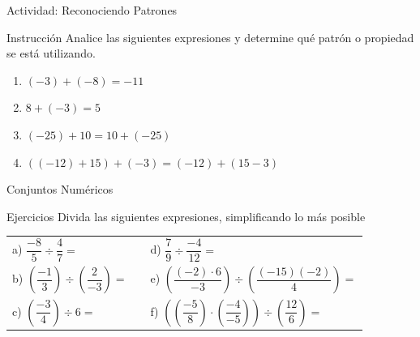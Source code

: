 \documentclass[aspectratio=169,handout,11pt]{beamer}
\begin{document}
	\begin{frame}{Actividad: Reconociendo Patrones}
		\begin{block}{Instrucción}
			Analice las siguientes expresiones y determine qué patrón o propiedad se está utilizando.
		\end{block}
		
		\begin{enumerate}[<+->]
			\item $(-3) + (-8) = -11$
			
			\item $8 + (-3) = 5$
			
			\item $(−25) + 10 = 10 + (−25)$
			
			\item $((−12) + 15) + (−3) = (−12) + (15 − 3)$
		\end{enumerate}
		
	\end{frame}
	
	\begin{frame}{Conjuntos Numéricos}
		\begin{block}{Ejercicios}
			Divida las siguientes expresiones, simplificando lo más posible
			
			\begin{tabular}{lll}
				a) $\dfrac{-8}{5}\div\dfrac{4}{7}=$\pause & &
				d) $\dfrac{7}{9}\div\dfrac{-4}{12}=$\pause \\[0.2cm]
				
				b) $\left(\dfrac{-1}{3}\right)\div\left(\dfrac{2}{-3}\right)=$\pause & &
				e) $\left(\dfrac{(-2)\cdot6}{-3}\right)\div\left(\dfrac{(-15)(-2)}{4}\right)=$\pause \\[0.2cm]
				
				c) $\left(\dfrac{-3}{4}\right)\div6=$\pause & &
				f) $\left(\left(\dfrac{-5}{8}\right)\cdot\left(\dfrac{-4}{-5}\right)\right)\div\left(\dfrac{12}{6}\right)=$
			\end{tabular}
		\end{block}
	\end{frame}
	
\end{document}
